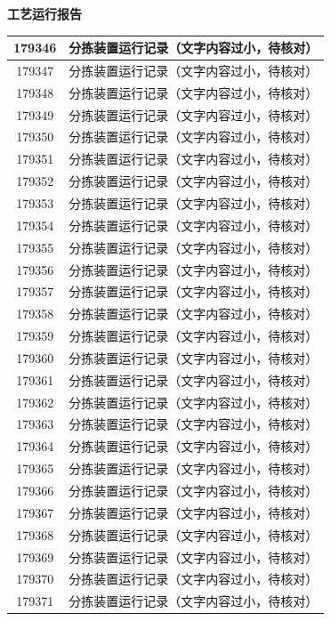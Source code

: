 \documentclass[UTF8,10pt,a4paper,fontset=fandol]{ctexart}
\begin{document}
\vspace{8mm}

\begin{center}
\begin{minipage}[t]{0.46\textwidth}
\centering
\textbf{工艺运行报告}

\small
\begin{tabularx}{\linewidth}{|c|X|}
\hline
179346 & 分拣装置运行记录（文字内容过小，待核对）\\ \hline
179347 & 分拣装置运行记录（文字内容过小，待核对）\\ \hline
179348 & 分拣装置运行记录（文字内容过小，待核对）\\ \hline
179349 & 分拣装置运行记录（文字内容过小，待核对）\\ \hline
179350 & 分拣装置运行记录（文字内容过小，待核对）\\ \hline
179351 & 分拣装置运行记录（文字内容过小，待核对）\\ \hline
179352 & 分拣装置运行记录（文字内容过小，待核对）\\ \hline
179353 & 分拣装置运行记录（文字内容过小，待核对）\\ \hline
179354 & 分拣装置运行记录（文字内容过小，待核对）\\ \hline
179355 & 分拣装置运行记录（文字内容过小，待核对）\\ \hline
179356 & 分拣装置运行记录（文字内容过小，待核对）\\ \hline
179357 & 分拣装置运行记录（文字内容过小，待核对）\\ \hline
179358 & 分拣装置运行记录（文字内容过小，待核对）\\ \hline
179359 & 分拣装置运行记录（文字内容过小，待核对）\\ \hline
179360 & 分拣装置运行记录（文字内容过小，待核对）\\ \hline
179361 & 分拣装置运行记录（文字内容过小，待核对）\\ \hline
179362 & 分拣装置运行记录（文字内容过小，待核对）\\ \hline
179363 & 分拣装置运行记录（文字内容过小，待核对）\\ \hline
179364 & 分拣装置运行记录（文字内容过小，待核对）\\ \hline
179365 & 分拣装置运行记录（文字内容过小，待核对）\\ \hline
179366 & 分拣装置运行记录（文字内容过小，待核对）\\ \hline
179367 & 分拣装置运行记录（文字内容过小，待核对）\\ \hline
179368 & 分拣装置运行记录（文字内容过小，待核对）\\ \hline
179369 & 分拣装置运行记录（文字内容过小，待核对）\\ \hline
179370 & 分拣装置运行记录（文字内容过小，待核对）\\ \hline
179371 & 分拣装置运行记录（文字内容过小，待核对）\\ \hline
\end{tabularx}


\end{minipage}
\end{center}
\end{document}
